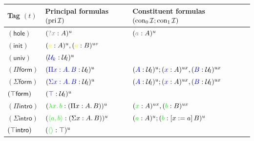 \documentclass[twoside]{report}
\begin{document}
\begin{table}[ht]
    \centering
    \begin{tabular}{lll}\hline
        Tag $(t)$                & Principal formulas $(\operatorname{pri} \mathcal I)$                      & Constituent formulas $({\operatorname{con}_0 \mathcal I}; {\operatorname{con}_1 \mathcal I})$                                   \\\hline
        $(\mathsf{hole})$        & $(\textcolor{gray}{?x} : A)^u$                                    & $(\textcolor{gray}a : A)^u$                                                                                         \\
        $(\mathsf{init})$        & $(\textcolor{yellow}{a} : A)^u, (\textcolor{yellow}{a} : B)^{uv}$ &                                                                                                                     \\
        $(\mathsf{univ})$        & $(\textcolor{blue}{\mathcal U_k} : \mathcal U_l)^u$               &                                                                                                                     \\
        $(\Pi\mathsf{form})$     & $(\textcolor{blue}{\Pi{x} : {A}.\,{B}} : \mathcal U_l)^u$                 & $(\textcolor{blue}{A} : \mathcal U_l)^u; (\textcolor{blue}{x} : A)^{ux}, (\textcolor{blue}{B} : \mathcal U_l)^{ux}$ \\
        $(\Sigma\mathsf{form})$  & $(\textcolor{blue}{\Sigma{x} : {A}.\,{B}} : \mathcal U_l)^u$                 & $(\textcolor{blue}{A} : \mathcal U_l)^u; (\textcolor{blue}{x} : A)^{ux}, (\textcolor{blue}{B} : \mathcal U_l)^{ux}$ \\
        $(\top\mathsf{form})$   & $(\textcolor{blue}{\top} : \mathcal U_l)^u$                      &                                                                                                                     \\
        $(\Pi\mathsf{intro})$    & $(\textcolor{green}{\lambda{x}.\,{b}} : (\Pi{x} : {A}.\,{B}))^u$                  & $(\textcolor{green}{x} : A)^{ux}, (\textcolor{green}{b} : B)^{ux}$                                                  \\
        $(\Sigma\mathsf{intro})$ & $(\textcolor{green}{\langle{a}, {b}\rangle} : (\Sigma{x} : {A}.\,{B}))^u$                 & $(\textcolor{green}{a} : A)^u; (\textcolor{green}{b} : [{x}:={a}]\,{B})^u$                                              \\
        $(\top\mathsf{intro})$  & $(\textcolor{green}{\langle\rangle} : \top)^u$                           &                                                                                                                     \\

\end{tabular}
\end{table}
\end{document}
